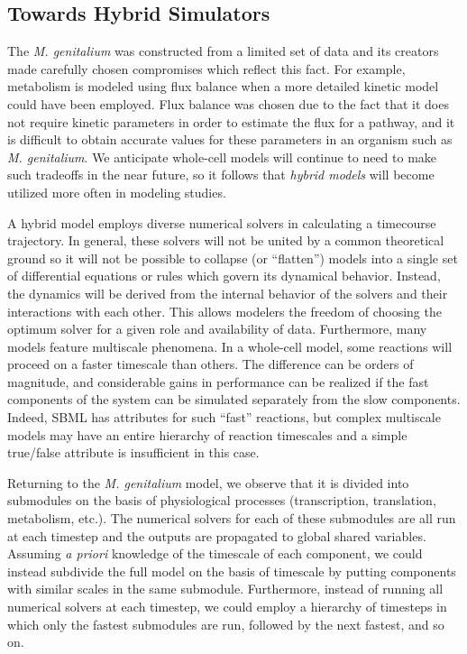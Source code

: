 \documentclass[journal,transmag,twoside]{IEEEtran}
\begin{document}
\subsection{Towards Hybrid Simulators}

The \textit{M. genitalium} was constructed from a limited set of data and its creators made carefully chosen compromises which reflect this fact. For example, metabolism is modeled using flux balance when a more detailed kinetic model could have been employed. Flux balance was chosen due to the fact that it does not require kinetic parameters in order to estimate the flux for a pathway, and it is difficult to obtain accurate values for these parameters in an organism such as \textit{M. genitalium}. We anticipate whole-cell models will continue to need to make such tradeoffs in the near future, so it follows that \textit{hybrid models} will become utilized more often in modeling studies.

A hybrid model employs diverse numerical solvers in calculating a timecourse trajectory. In general, these solvers will not be united by a common theoretical ground so it will not be possible to collapse (or ``flatten'') models into a single set of differential equations or rules which govern its dynamical behavior.
Instead, the dynamics will be derived from the internal behavior of the solvers and their interactions with each other. This allows modelers the freedom of choosing the optimum solver for a given role and availability of data.
Furthermore, many models feature multiscale phenomena. In a whole-cell model, some reactions will proceed on a faster timescale than others. The difference can be orders of magnitude, and considerable gains in performance can be realized if the fast components of the system can be simulated separately from the slow components. Indeed, SBML has attributes for such ``fast'' reactions, but complex multiscale models may have an entire hierarchy of reaction timescales and a simple true/false attribute is insufficient in this case.

Returning to the \textit{M. genitalium} model, we observe that it is divided into submodules on the basis of physiological processes (transcription, translation, metabolism, etc.). The numerical solvers for each of these submodules are all run at each timestep and the outputs are propagated to global shared variables. Assuming \textit{a priori} knowledge of the timescale of each component, we could instead subdivide the full model on the basis of timescale by putting components with similar scales in the same submodule. Furthermore, instead of running all numerical solvers at each timestep, we could employ a hierarchy of timesteps in which only the fastest submodules are run, followed by the next fastest, and so on.
\end{document}
